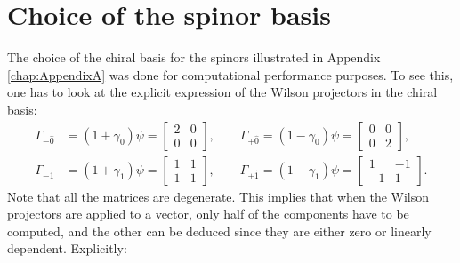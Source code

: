 \section*{Choice of the spinor basis}
The choice of the chiral basis for the spinors illustrated in Appendix \ref{chap:AppendixA} was done for computational performance purposes. 
To see this, one has to look at the explicit expression of the Wilson projectors in the chiral basis:
\begin{equation*}
    \begin{aligned}
        \Gamma_{- \hat 0} &= \left(1+\gamma_0\right) \psi=\left[\begin{array}{ll}
            2 & 0 \\
            0 & 0
            \end{array}\right],
        \qquad 
        \Gamma_{+ \hat 0} = \left(1-\gamma_0\right) \psi=\left[\begin{array}{ll}
            0 & 0 \\
            0 & 2
            \end{array}\right],\\
        \Gamma_{- \hat 1} &= \left(1+\gamma_1\right) \psi=\left[\begin{array}{ll}
            1 & 1 \\
            1 & 1
            \end{array}\right],
        \qquad 
        \Gamma_{+ \hat 1} = \left(1-\gamma_1\right) \psi=\left[\begin{array}{cc}
            1 & -1 \\
            -1 & 1
            \end{array}\right].
    \end{aligned}
\end{equation*}
Note that all the matrices are degenerate. This implies that when the Wilson projectors are applied to a vector, only half of the components have to be computed, and the other can be deduced since they are either zero or linearly dependent. Explicitly:
